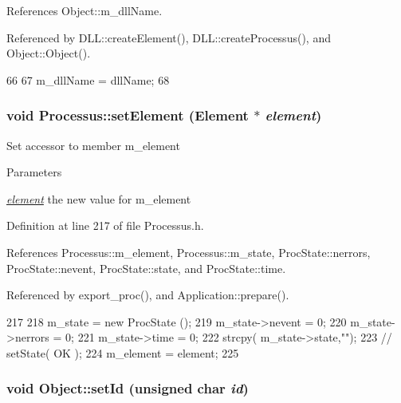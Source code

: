 References Object::m\_\-dllName.

Referenced by DLL::createElement(), DLL::createProcessus(), and Object::Object().


\begin{DoxyCode}
66                                       {
67     m_dllName = dllName;
68   }
\end{DoxyCode}
\hypertarget{classProcessus_a8ddef94227d83d9dae2cd49aebc33353}{
\subsubsection[{setElement}]{\setlength{\rightskip}{0pt plus 5cm}void Processus::setElement ({\bf Element} $\ast$ {\em element})}}
\label{classProcessus_a8ddef94227d83d9dae2cd49aebc33353}
Set accessor to member m\_\-element 
\begin{DoxyParams}{Parameters}
\item[{\em \hyperlink{namespaceelement}{element}}]the new value for m\_\-element \end{DoxyParams}


Definition at line 217 of file Processus.h.

References Processus::m\_\-element, Processus::m\_\-state, ProcState::nerrors, ProcState::nevent, ProcState::state, and ProcState::time.

Referenced by export\_\-proc(), and Application::prepare().


\begin{DoxyCode}
217                                      {
218     m_state = new ProcState ();
219     m_state->nevent  = 0;
220     m_state->nerrors = 0;
221     m_state->time    = 0;
222     strcpy( m_state->state,"");
223     //  setState( OK );
224     m_element = element;
225   }
\end{DoxyCode}
\hypertarget{classObject_a398fe08cba594a0ce6891d59fe4f159f}{
\subsubsection[{setId}]{\setlength{\rightskip}{0pt plus 5cm}void Object::setId (unsigned char {\em id})}}
\label{classObject_a398fe08cba594a0ce6891d59fe4f159f}


